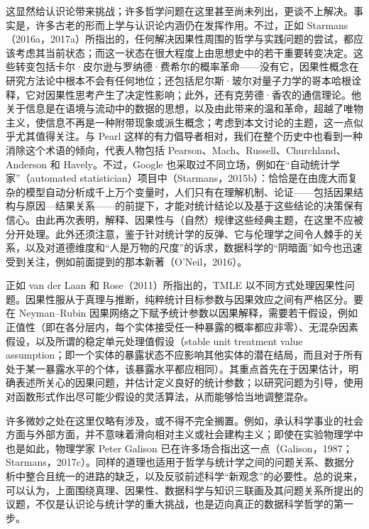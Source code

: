 这显然给认识论带来挑战；许多哲学问题在这里甚至尚未列出，更谈不上解决。事实是，许多古老的形而上学与认识论内涵仍在发挥作用。不过，正如 Starmans（2016a，2017a）所指出的，任何解决因果性周围的哲学与实践问题的尝试，都应该考虑其当前状态；而这一状态在很大程度上由思想史中的若干重要转变决定。这些转变包括卡尔·皮尔逊与罗纳德·费希尔的概率革命——没有它，因果性概念在研究方法论中根本不会有任何地位；还包括尼尔斯·玻尔对量子力学的哥本哈根诠释，它对因果性思考产生了决定性影响；此外，还有克劳德·香农的通信理论。他关于信息是在语境与流动中的数据的思想，以及由此带来的温和革命，超越了唯物主义，使信息不再是一种附带现象或派生概念；考虑到本文讨论的主题，这一点似乎尤其值得关注。与 Pearl 这样的有力倡导者相对，我们在整个历史中也看到一种消除这个术语的倾向，代表人物包括 Pearson、Mach、Russell、Churchland、Anderson 和 Havely。不过，Google 也采取过不同立场，例如在“自动统计学家”（automated statistician）项目中（Starmans，2015b）：恰恰是在由庞大而复杂的模型自动分析成千上万个变量时，人们只有在理解机制、论证——包括因果结构与原因—结果关系——的前提下，才能对统计结论以及基于这些结论的决策保有信心。由此再次表明，解释、因果性与（自然）规律这些经典主题，在这里不应被分开处理。此外还须注意，鉴于针对统计学的反弹、它与伦理学之间令人棘手的关系，以及对道德维度和“人是万物的尺度”的诉求，数据科学的“阴暗面”如今也迅速受到关注，例如前面提到的那本新著（O'Neil，2016）。

正如 van der Laan 和 Rose（2011）所指出的，TMLE 以不同方式处理因果性问题。因果性服从于真理与推断，纯粹统计目标参数与因果效应之间有严格区分。要在 Neyman–Rubin 因果网络之下赋予统计参数以因果解释，需要若干假设，例如正值性（即在各分层内，每个实体接受任一种暴露的概率都应非零）、无混杂因素假设，以及所谓的稳定单元处理值假设（stable unit treatment value assumption；即一个实体的暴露状态不应影响其他实体的潜在结局，而且对于所有处于某一暴露水平的个体，该暴露水平都应相同）。其重点首先在于因果估计，明确表述所关心的因果问题，并估计定义良好的统计参数；以研究问题为引导，使用对函数形式作出尽可能少假设的灵活算法，从而能够恰当地调整混杂。

许多微妙之处在这里仅略有涉及，或不得不完全搁置。例如，承认科学事业的社会方面与外部方面，并不意味着滑向相对主义或社会建构主义；即使在实验物理学中也是如此，物理学家 Peter Galison 已在许多场合指出这一点（Galison，1987；Starmans，2017c）。同样的道理也适用于哲学与统计学之间的问题关系、数据分析中整合且统一的进路的缺乏，以及反驳前述科学“新观念”的必要性。总的说来，可以认为，上面围绕真理、因果性、数据科学与知识三联画及其问题关系所提出的议题，不仅是认识论与统计学的重大挑战，也是迈向真正的数据科学哲学的第一步。
